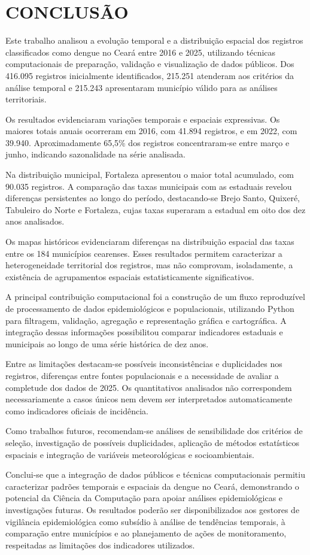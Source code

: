 
\begingroup
\let\clearpage\relax
\chapter{CONCLUSÃO}
\label{sec:conclusao}
\endgroup

Este trabalho analisou a evolução temporal e a distribuição espacial dos registros classificados como dengue no Ceará entre 2016 e 2025, utilizando técnicas computacionais de preparação, validação e visualização de dados públicos. Dos 416.095 registros inicialmente identificados, 215.251 atenderam aos critérios da análise temporal e 215.243 apresentaram município válido para as análises territoriais.

Os resultados evidenciaram variações temporais e espaciais expressivas. Os maiores totais anuais ocorreram em 2016, com 41.894 registros, e em 2022, com 39.940. Aproximadamente 65,5\% dos registros concentraram-se entre março e junho, indicando sazonalidade na série analisada.

Na distribuição municipal, Fortaleza apresentou o maior total acumulado, com 90.035 registros. A comparação das taxas municipais com as estaduais revelou diferenças persistentes ao longo do período, destacando-se Brejo Santo, Quixeré, Tabuleiro do Norte e Fortaleza, cujas taxas superaram a estadual em oito dos dez anos analisados.

Os mapas históricos evidenciaram diferenças na distribuição espacial das taxas entre os 184 municípios cearenses. Esses resultados permitem caracterizar a heterogeneidade territorial dos registros, mas não comprovam, isoladamente, a existência de agrupamentos espaciais estatisticamente significativos.

A principal contribuição computacional foi a construção de um fluxo reproduzível de processamento de dados epidemiológicos e populacionais, utilizando Python para filtragem, validação, agregação e representação gráfica e cartográfica. A integração dessas informações possibilitou comparar indicadores estaduais e municipais ao longo de uma série histórica de dez anos.

Entre as limitações destacam-se possíveis inconsistências e duplicidades nos registros, diferenças entre fontes populacionais e a necessidade de avaliar a completude dos dados de 2025. Os quantitativos analisados não correspondem necessariamente a casos únicos nem devem ser interpretados automaticamente como indicadores oficiais de incidência.

Como trabalhos futuros, recomendam-se análises de sensibilidade dos critérios de seleção, investigação de possíveis duplicidades, aplicação de métodos estatísticos espaciais e integração de variáveis meteorológicas e socioambientais.

Conclui-se que a integração de dados públicos e técnicas computacionais permitiu caracterizar padrões temporais e espaciais da dengue no Ceará, demonstrando o potencial da Ciência da Computação para apoiar análises epidemiológicas e investigações futuras. Os resultados poderão ser disponibilizados aos gestores de vigilância epidemiológica como subsídio à análise de tendências temporais, à comparação entre municípios e ao planejamento de ações de monitoramento, respeitadas as limitações dos indicadores utilizados.
